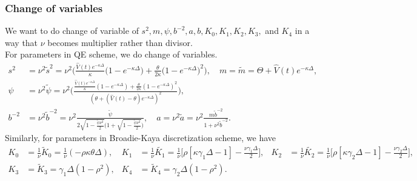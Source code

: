\documentclass{ws-ijfe}
\begin{document}
\subsubsection{Change of variables}
We want to do change of variable of $s^2, m, \psi, b^{-2}, a, b, K_0,K_1,K_2, K_3,$ and $ K_4$ in a way that $\nu$ becomes multiplier rather than divisor.\\
For parameters in QE scheme, we do change of variables.
\begin{align*}
s^2&=\nu^2\tilde{s}^2={\nu}^2\bigg(\frac{\hat{V}(t)e^{-\kappa\Delta}}{\kappa}\bigg(1-e^{-\kappa\Delta}\bigg)+\frac{\theta}{2\kappa}\bigg(1-e^{-\kappa\Delta}\bigg)^2\bigg),
\quad m=\tilde{m}=\Theta + \hat{V}(t)e^{-\kappa\Delta}, \\
  \psi&=\nu^2\tilde{\psi}=\nu^2\bigg(\frac{\frac{\hat{V}(t)e^{-\kappa\Delta}}{\kappa}(1-e^{-\kappa\Delta})+\frac{\theta}{2\kappa}(1-e^{-\kappa\Delta})^2}{(\theta+(\hat{V}(t)-\theta)e^{-\kappa\Delta})^2}\bigg),\\
b^{-2}&=\nu^2\tilde{b}^{-2}=\nu^2\frac{\tilde{\psi}}{2\sqrt{1-\frac{\tilde{\psi}\nu^2}{2}}\bigg(1+\sqrt{1-\frac{\tilde{\psi}\nu^2}{2}}\bigg)} ,\quad
a=\nu^2\tilde{a}=\nu^2\frac{m\tilde{b}^{-2}}{1+\nu^2\tilde{b}^{-2}}.
\end{align*}
Similarly, for parameters in Broadie-Kaya discretization scheme, we have
\begin{align*}
   K_0&=\frac{1}{\nu}\tilde{K}_0 =\frac{1}{\nu}(-\rho\kappa\theta\Delta),&   K_1&=\frac{1}{\nu}\tilde{K_1}=\frac{1}{\nu}\bigg[\rho[\kappa\gamma_1\Delta-1]-\frac{\nu\gamma_1\Delta}{2}\bigg],
&  K_2&=\frac{1}{\nu}\tilde{K_2}=\frac{1}{\nu}\bigg[\rho[\kappa\gamma_2\Delta-1]-\frac{\nu\gamma_2\Delta}{2}\bigg],\\
   K_3&=\tilde{K}_3=\gamma_1\Delta(1-\rho^2), & K_4&=\tilde{K}_4=\gamma_2\Delta(1-\rho^2).
\end{align*}
\end{document}
